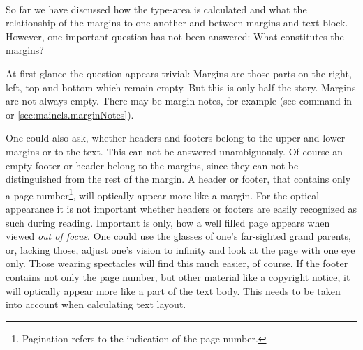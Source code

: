 %
%
\begin{Declaration}
  \\
\end{Declaration}%
\begin{Explain}%
  So far we have discussed how the type-area is
  calculated and what the relationship of the
  margins to one another and between margins and text
  block. However, one important question has not been answered: What
  constitutes the margins?

  At first glance the question appears trivial: Margins are those
  parts on the right, left, top and bottom which remain empty. But
  this is only half the story. Margins are not always empty. There may
  be margin notes, for example (see  command in
  \cite{lshort} or \autoref{sec:maincls.marginNotes}).

  One could also ask, whether headers and
  footers belong to the upper and lower margins or
  to the text. This can not be answered unambiguously. Of course an
  empty footer or header belong to the margins, since they can not be
  distinguished from the rest of the margin. A header or footer, that
  contains only a page
  number\footnote{Pagination refers to
    the indication of the page number.}, will optically appear more
  like a margin. For the optical appearance it is not important
  whether headers or footers are easily recognized as such during
  reading.  Important is only, how a well filled page appears when
  viewed \emph{out of focus}. One could use the glasses of one's
  far-sighted grand parents, or, lacking those, adjust one's vision to
  infinity and look at the page with one eye only. Those wearing
  spectacles will find this much easier, of course.  If the footer
  contains not only the page number, but other material like a
  copyright notice, it will optically appear more like a part of the
  text body.  This needs to be taken into account when calculating
  text layout.


\end{Explain}
